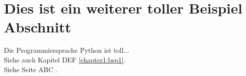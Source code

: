 \section{Dies ist ein weiterer toller Beispiel Abschnitt}



Die Programmiersprache Python ist toll... \cite{Pilgrim2009} \\

Siehe auch Kapitel DEF \ref{chapter1:bsp1}. \\

Siehe Seite ABC \pageref{chapter1:bsp1}.